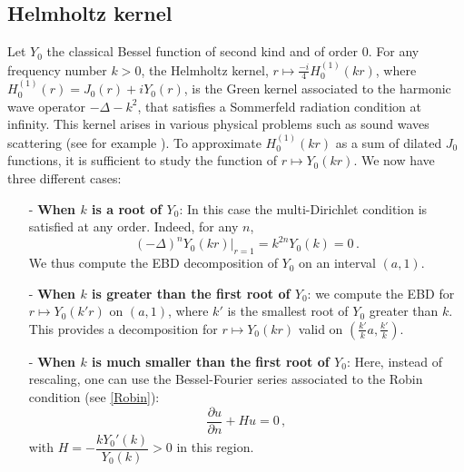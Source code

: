 \documentclass[smallextended]{svjour3}
\begin{document}
\subsection{Helmholtz kernel}
\label{HelmoholtzSubSection}
Let $Y_0$ the classical Bessel function of second kind and of order $0$. For any frequency number $k>0$, the Helmholtz kernel, $r \mapsto \frac{-i}{4}H^{(1)}_0(kr)$, where $H^{(1)}_0(r) = J_0(r) + i Y_0(r)$, is the Green kernel associated to the harmonic wave operator $- \Delta - k^2$, that satisfies a Sommerfeld radiation condition at infinity. This kernel arises in various physical problems such as sound waves scattering  (see for example  \cite{wilcox1975scattering}). To approximate $H^{(1)}_0(kr)$ as a sum of dilated $J_0$ functions, it is sufficient to study the function of $r \mapsto Y_0(kr)$. We now have three different cases:
\begin{itemize}
	\item[-]\textbf{When $k$ is a root of $Y_0$}: In this case the multi-Dirichlet condition is satisfied at any order. Indeed, for any $n$, 
\[(-\Delta)^n Y_0(kr)\big|_{r=1} = k^{2n} Y_0(k) = 0\,.\]
We thus compute the EBD decomposition of $Y_0$ on an interval $(a,1)$. 
	\item[-]\textbf{When $k$ is greater than the first root of $Y_0$}: we compute the EBD for $r \mapsto Y_0(k'r)$ on $(a,1)$, where $k'$ is the smallest root of $Y_0$ greater than $k$. This provides a decomposition for $r \mapsto Y_0(kr)$ valid on $(\frac{k'}{k}a,\frac{k'}{k})$.
	\item[-]\textbf{When $k$ is much smaller than the first root of $Y_0$}: Here, instead of rescaling, one can use the Bessel-Fourier series associated to the Robin condition (see \autoref{Robin}):
\[\dfrac{\partial u}{\partial n} + H u = 0\,,\]
with $H = -\dfrac{k Y_0'(k)}{Y_0(k)} > 0$ in this region. 
\end{itemize}
\noindent
																													
\end{document}
